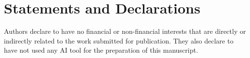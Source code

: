 \section*{Statements and Declarations}

Authors declare to have no financial or non-financial interests
that are directly or indirectly related to the work submitted for publication. 
They also declare to have not used any AI tool for the preparation of this
manuscript.
